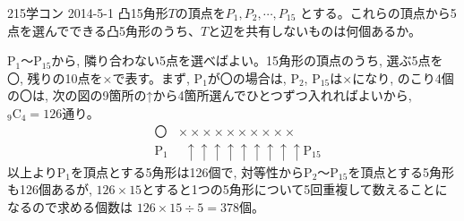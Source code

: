 \begin{prob}{215}{}{学コン 2014-5-1}
 凸15角形$T$の頂点を$P_1, P_2, \cdots, P_{15}$ とする。これらの頂点から5点を選んでできる凸5角形のうち、$T$と辺を共有しないものは何個あるか。
\end{prob}
P$_1$～P$_{15}$から, 隣り合わない5点を選べばよい。15角形の頂点のうち, 選ぶ5点を〇, 残りの10点を×で表す。まず, P$_1$が〇の場合は, P$_2$, P$_15$は×になり, のこり4個の〇は, 次の図の9箇所の↑から4箇所選んでひとつずつ入れればよいから, ${}_9 \mbox{C}_4=126$通り。
\begin{eqnarray*}
&〇&　×　×　×　×　×　×　×　×　×　×\\
&\mbox{P}_1&　\,\,\,↑　\!↑　\!\!↑　\!\!↑　\!\!↑　\!↑　\!\!↑　\!\!↑　\!↑\mbox{P}_{15}
\end{eqnarray*}
以上よりP$_1$を頂点とする5角形は126個で, 対等性からP$_2$～P$_{15}$を頂点とする5角形も126個あるが, $126\times 15$とすると1つの5角形について5回重複して数えることになるので求める個数は $126\times 15\div 5= 378$個。